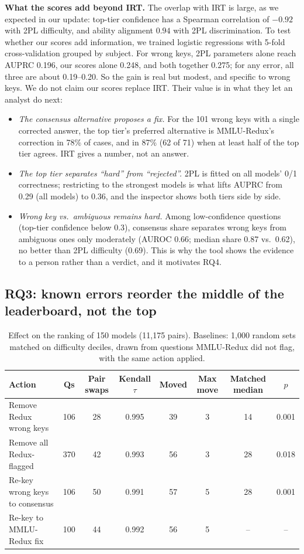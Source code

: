 \documentclass[10pt]{article}
\begin{document}
\textbf{What the scores add beyond IRT.} The overlap with IRT is large, as we expected in our update:
top-tier confidence has a Spearman correlation of $-0.92$ with 2PL difficulty, and ability alignment
$0.94$ with 2PL discrimination. To test whether our scores add information, we trained logistic
regressions with 5-fold cross-validation grouped by subject. For wrong keys, 2PL parameters alone
reach AUPRC 0.196, our scores alone 0.248, and both together 0.275; for any error, all three are about
0.19--0.20. So the gain is real but modest, and specific to wrong keys. We do not claim our scores
replace IRT. Their value is in what they let an analyst do next:
\begin{itemize}
  \item \emph{The consensus alternative proposes a fix.} For the 101 wrong keys with a single
    corrected answer, the top tier's preferred alternative is MMLU-Redux's correction in 78\% of cases,
    and in 87\% (62 of 71) when at least half of the top tier agrees. IRT gives a number, not an answer.
  \item \emph{The top tier separates ``hard'' from ``rejected''.} 2PL is fitted on all models' 0/1
    correctness; restricting to the strongest models is what lifts AUPRC from 0.29 (all models) to
    0.36, and the inspector shows both tiers side by side.
  \item \emph{Wrong key vs.\ ambiguous remains hard.} Among low-confidence questions (top-tier
    confidence below 0.3), consensus share separates wrong keys from ambiguous ones only moderately
    (AUROC 0.66; median share 0.87 vs.\ 0.62), no better than 2PL difficulty (0.69). This is why the
    tool shows the evidence to a person rather than a verdict, and it motivates RQ4.
\end{itemize}

\subsection{RQ3: known errors reorder the middle of the leaderboard, not the top}

\begin{table}[!htb]
\centering\small
\caption{Effect on the ranking of 150 models (11,175 pairs). Baselines: 1,000 random sets matched on
difficulty deciles, drawn from questions MMLU-Redux did not flag, with the same action applied.}
\label{tab:rq3}
\begin{tabular}{@{}lccccccc@{}}
\toprule
Action & Qs & Pair swaps & Kendall $\tau$ & Moved & Max move & Matched median & $p$ \\
\midrule
Remove Redux wrong keys & 106 & 28 & 0.995 & 39 & 3 & 14 & 0.001 \\
Remove all Redux-flagged & 370 & 42 & 0.993 & 56 & 3 & 28 & 0.018 \\
Re-key wrong keys to consensus & 106 & 50 & 0.991 & 57 & 5 & 28 & 0.001 \\
Re-key to MMLU-Redux fix & 100 & 44 & 0.992 & 56 & 5 & -- & -- \\
\bottomrule
\end{tabular}
\end{table}
\end{document}
